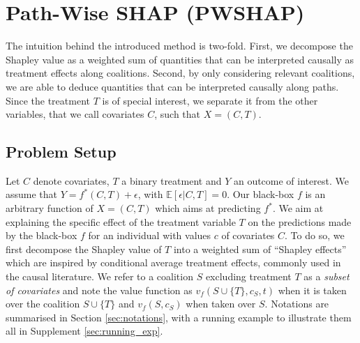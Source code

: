 \documentclass{article}
\theoremstyle{plain}
\theoremstyle{definition}
\theoremstyle{remark}
\theoremstyle{mystyle}
\begin{document}
\section{Path-Wise SHAP (PWSHAP)} 
\label{sec:pwshap}
The intuition behind the introduced method is two-fold. First, we decompose the Shapley value as a weighted sum of quantities that can be interpreted causally as treatment effects along coalitions. Second, by only considering relevant coalitions, we are able to deduce quantities that can be interpreted causally along paths. Since the treatment $T$ is of special interest, we separate it from the other variables, that we call covariates $C$, such that $X=(C,T)$.
\subsection{Problem Setup}
\label{subsec:problem_Setup}
Let $C$ denote covariates, $T$ a binary treatment and $Y$ an outcome of interest. We assume that
$Y = f^*(C,T) + \epsilon$, with $\mathbb{E}[\epsilon|C,T] = 0$. %
Our black-box $f$ is an arbitrary function of $X = (C,T)$ which aims at predicting $f^*$. We aim at explaining the specific effect of the treatment variable $T$ on the predictions made by the black-box $f$ for an individual with values $c$ of covariates $C$. To do so, we first decompose the Shapley value of $T$ into a weighted sum of ``Shapley effects''  which are inspired by conditional average treatment effects, commonly used in the causal literature. We refer to a coalition $S$ excluding treatment $T$ as a \textit{subset of covariates} and note the value function as $v_f(S \cup \{T\},c_{S},t)$ when it is taken over the coalition $S \cup \{T\}$ and $v_f(S,c_{S})$ when taken over $S$. Notations are summarised in Section \ref{sec:notations}, with a running example to illustrate them all in Supplement \ref{sec:running_exp}.
\end{document}
